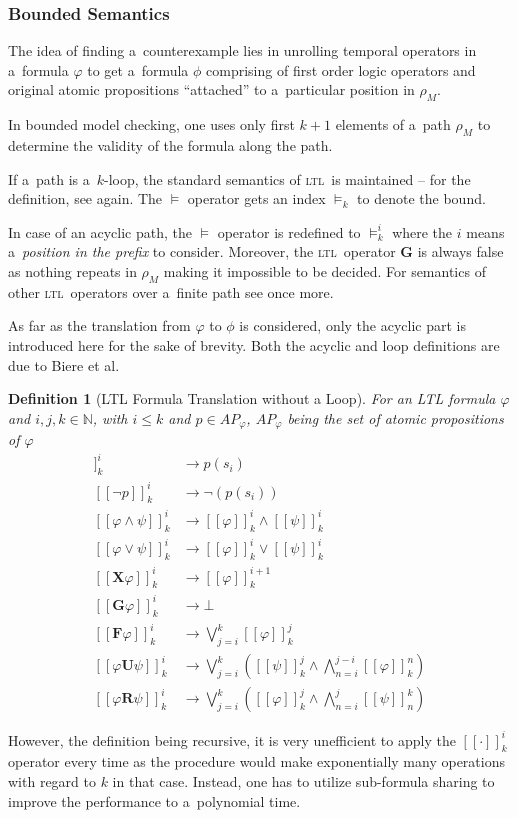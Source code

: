 \documentclass[12pt,oneside,draft]{fithesis}
\newcommand{\ltl}{\textsc{ltl}~}
\newcommand{\mNatural}{\mathbb{N}}
\newcommand{\bF}{\mathbf{F}}
\newcommand{\bG}{\mathbf{G}}
\newcommand{\bX}{\mathbf{X}}
\newcommand{\bU}{\mathbf{U}}
\newcommand{\bR}{\mathbf{R}}
\newtheorem{mydef}{Definition}
\begin{document}
\subsubsection*{Bounded Semantics}
The idea of finding a~counterexample lies in unrolling temporal
operators in a~formula $\varphi$ to get a~formula $\phi$ comprising
of first order logic operators and original atomic propositions
``attached'' to a~particular position in $\rho_M$.

In bounded model checking, one uses only first $k+1$ elements of
a~path $\rho_M$ to determine the validity of the formula along the
path\cite{biere}.

If a~path is a~$k$-loop, the standard semantics of \ltl is maintained --
for the definition, see again\cite{biere}. The $\models$ operator gets
an index $\models_k$ to denote the bound.

In case of an acyclic path, the $\models$ operator is redefined to
$\models_k^i$ where the $i$ means a~\emph{position in the prefix} to
consider. Moreover, the \ltl operator $\bG$ is always false as nothing
repeats in $\rho_M$ making it impossible to be decided. For semantics
of other \ltl operators over a~finite path see once more\cite{biere}.

As far as the translation from $\varphi$ to $\phi$ is considered,
only the acyclic part is introduced here for the
sake of brevity. Both the acyclic and loop definitions are due to
Biere et al\cite{biere}.

\begin{mydef}[LTL Formula Translation without a Loop]
For an LTL formula $\varphi$ and $i,j,k\in\mNatural$, with $i\leq k$ and
$p\in {AP}_\varphi$, ${AP}_\varphi$ being the set of atomic propositions
of $\varphi$
\begin{align}
	[[p]]_k^i&\rightarrow p(s_i)\\
	[[\neg p]]_k^i&\rightarrow\neg(p(s_i))\\
	[[\varphi\wedge\psi]]_k^i&\rightarrow
		[[\varphi]]_k^i\wedge[[\psi]]_k^i\\
	[[\varphi\vee\psi]]_k^i&\rightarrow
		[[\varphi]]_k^i\vee[[\psi]]_k^i\\
	[[\bX\varphi]]_k^i&\rightarrow[[\varphi]]_k^{i+1}\\
	[[\bG\varphi]]_k^i&\rightarrow\bot\\
	[[\bF\varphi]]_k^i&\rightarrow\bigvee_{j=i}^k[[\varphi]]_k^j\\
	[[\varphi\bU\psi]]_k^i&\rightarrow\bigvee_{j=i}^k\left(
		[[\psi]]_k^j\wedge\bigwedge_{n=i}^{j-i}[[\varphi]]_k^n
	\right)\\
	[[\varphi\bR\psi]]_k^i&\rightarrow\bigvee_{j=i}^k\left(
		[[\varphi]]_k^j\wedge\bigwedge_{n=i}^j[[\psi]]_n^k
	\right)
\end{align} 
\end{mydef}
However, the definition being recursive, it is very unefficient to
apply the $[[\cdot]]_k^i$ operator every time as the procedure would
make exponentially many operations with regard to $k$ in that case.
Instead, one has to utilize sub-formula sharing to improve the
performance to a~polynomial time\cite{biere}.
\end{document}
